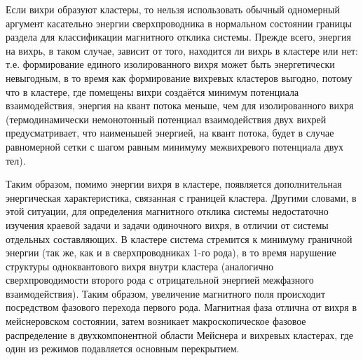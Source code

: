Если вихри образуют кластеры, то нельзя использовать обычный одномерный 
аргумент касательно энергии сверхпроводника в нормальном состоянии границы 
раздела для классификации магнитного отклика системы. Прежде всего, энергия 
на вихрь, в таком случае, зависит от того, находится ли вихрь в кластере или 
нет: т.е. формирование единого изолированного вихря может быть энергетически 
невыгодным, в то время как формирование вихревых кластеров выгодно, потому что 
в кластере, где помещены вихри создаётся минимум потенциала взаимодействия, 
энергия на квант потока меньше, чем для изолированного вихря (термодинамически 
немонотонный потенциал взаимодействия двух вихрей предусматривает, что 
наименьшей энергией, на квант потока, будет в случае равномерной сетки с шагом 
равным минимуму межвихревого потенциала двух тел).

Таким образом, помимо энергии вихря в кластере, появляется дополнительная 
энергическая характеристика, связанная с границей кластера. Другими словами, в 
этой ситуации, для определения магнитного отклика системы недостаточно 
изучения краевой задачи и задачи одиночного вихря, в отличии от системы 
отдельных составляющих. В кластере система стремится к минимуму граничной 
энергии (так же, как и в сверхпроводниках 1-го рода), в то время нарушение 
структуры одноквантового вихря внутри кластера (аналогично сверхпроводимости 
второго рода с отрицательной энергией межфазного взаимодействия). Таким 
образом, увеличение магнитного поля происходит посредством фазового перехода 
первого рода. Магнитная фаза отлична от вихря в мейснеровском состоянии, затем 
возникает макроскопическое фазовое распределение в двухкомпонентной области 
Мейснера и вихревых кластерах, где один из режимов подавляется основным 
перекрытием. \cite{bib:main}

\newpage